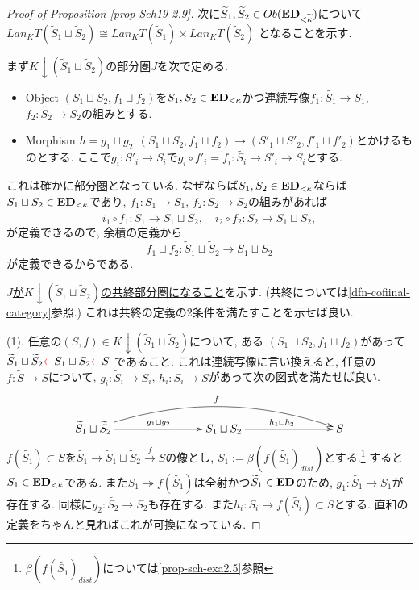\documentclass[dvipdfmx,a4paper,11pt]{report}
\theoremstyle{definition}
\newcommand{\xr}[1]{\textcolor{red}{#1}}
\begin{document}
\begin{proof}[Proof of Proposition \ref{prop-Sch19-2.9}]
次に$\widetilde{S}_1,  \widetilde{S}_2\in Ob({\bf ED}_{<\widetilde{\kappa}})$について
$Lan_{K}T (\widetilde{S}_1 \sqcup  \widetilde{S}_2) \cong
 Lan_{K}T (\widetilde{S}_1 ) \times  Lan_{K}T ( \widetilde{S}_2)$
となることを示す.

まず$K \downarrow  (\widetilde{S}_1 \sqcup  \widetilde{S}_2)$の部分圏$J$を次で定める.
\begin{itemize}
\item Object $(S_1 \sqcup  S_2, f_1 \sqcup  f_2)$を$S_1, S_2 \in {\bf ED}_{<\kappa}$かつ連続写像$f_1 : \widetilde{S_1} \to S_1$, $f_2 : \widetilde{S_2} \to S_2$の組みとする. 
\item Morphism $h=g_1\sqcup g_2 : (S_1 \sqcup S_2, f_1 \sqcup f_2) \to  (S'_{1} \sqcup S'_2, f'_1 \sqcup f'_2)$とかけるものとする. ここで$g_i : S'_{i} \to S_i$で$g_i \circ f'_i = f_{i} : \widetilde{S_i} \to S'_i \to S_{i}$とする. 
\end{itemize}
これは確かに部分圏となっている. 
なぜならば$S_1, S_2 \in {\bf ED}_{<\kappa}$ならば$S_1 \sqcup  S_2 \in {\bf ED}_{<\kappa}$であり, $f_1 : \widetilde{S_1} \to S_1$, $f_2 : \widetilde{S_2} \to S_2$の組みがあれば
$$
i_1 \circ f_1 : \widetilde{S_1} \to S_1 \sqcup S_2, \quad 
i_2 \circ f_2 : \widetilde{S_2} \to S_1 \sqcup S_2,
$$
が定義できるので, 余積の定義から
$$
f_1 \sqcup f_2  : \widetilde{S}_1 \sqcup \widetilde{S}_2  \to S_1 \sqcup S_2
$$
が定義できるからである. 

\underline{$J$が$K \downarrow  (\widetilde{S}_1 \sqcup  \widetilde{S}_2)$の共終部分圏になること}を示す.
(共終については\ref{dfn-cofiinal-category}参照.) 
これは共終の定義の2条件を満たすことを示せば良い.

(1). 任意の$(S, f) \in K \downarrow  (\widetilde{S}_1 \sqcup  \widetilde{S}_2)$について, ある
$(S_1 \sqcup  S_2, f_1 \sqcup  f_2)$があって
$\widetilde{S}_1 \sqcup  \widetilde{S}_2 \xr{\leftarrow} S_1 \sqcup  S_2  \xr{\leftarrow} S$
であること.
これは連続写像に言い換えると, 任意の$f : \widetilde{S} \to S$について, 
$g_i: \widetilde{S}_i \to S_i$, $h_i: S_i \to S$があって次の図式を満たせば良い.
\begin{equation*}
\label{eq-conti}
\xymatrix@C=78pt@R=20pt{
\widetilde{S}_1 \sqcup  \widetilde{S}_2 \ar@/^20pt/[rr]^{f} 
 \ar@{->}[r]^{g_1 \sqcup  g_2}
&S_1 \sqcup  S_2  \ar@{->}[r]^{h_1 \sqcup  h_2}
& S
\\
}
\end{equation*}
$f(\widetilde{S_1} ) \subset S$を$\widetilde{S_1} \to \widetilde{S}_1 \sqcup  \widetilde{S}_2 \overset{f}{\to} S$の像とし, $S_1 := \beta (f(\widetilde{S_1} )_{dist}) $とする.\footnote{ $\beta (f(\widetilde{S_1} )_{dist})$については\ref{prop-sch-exa2.5}参照}
すると$S_1 \in {\bf ED}_{<\kappa}$である.
また$S_1 \twoheadrightarrow f(\widetilde{S_1} ) $は全射かつ$\widetilde{S}_1 \in {\bf ED}$のため, $g_1 : \widetilde{S_1} \to S_1$が存在する. 
同様に$g_2 : \widetilde{S_2} \to S_2$も存在する.
また$h_i : S_i \to f(\widetilde{S_i} ) \subset S$とする.
直和の定義をちゃんと見ればこれが可換になっている.


\end{proof}
\end{document}
